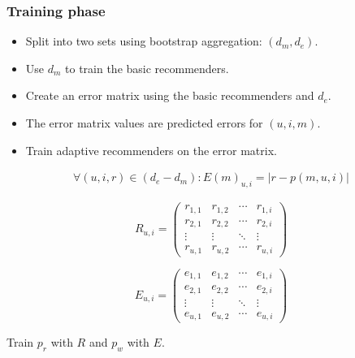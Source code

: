\documentclass[screen]{beamer}
\begin{document}
\begin{frame}
  
\end{frame}

\begin{frame}
  \frametitle{Training phase}
  
  \begin{itemize}
    \item Split into two sets using bootstrap aggregation: $(d_m,d_e)$.
    \item Use $d_m$ to train the basic recommenders.
    \item Create an error matrix using the basic recommenders and $d_e$. 
    \item The error matrix values are predicted errors for $(u,i,m)$.
    \item Train adaptive recommenders on the error matrix.
  \end{itemize}
  
  \begin{eqnarray}
    \forall (u,i,r) \in (d_e - d_m): E(m)_{u,i} = |r - p(m,u,i)|
  \end{eqnarray}
\end{frame}

\begin{frame}
  \begin{equation*}
     R_{u,i} =
     \begin{pmatrix}
      r_{1,1} & r_{1,2} & \cdots & r_{1,i} \\
      r_{2,1} & r_{2,2} & \cdots & r_{2,i} \\
      \vdots  & \vdots  & \ddots & \vdots  \\
      r_{u,1} & r_{u,2} & \cdots & r_{u,i}
     \end{pmatrix}
    \end{equation*}

  \vspace{1em}
  
    \begin{equation*}
     E_{u,i} =
     \begin{pmatrix}
        e_{1,1} & e_{1,2} & \cdots & e_{1,i} \\
        e_{2,1} & e_{2,2} & \cdots & e_{2,i} \\
        \vdots  & \vdots  & \ddots & \vdots  \\
        e_{u,1} & e_{u,2} & \cdots & e_{u,i}
     \end{pmatrix}
    \end{equation*}
    
    \vspace{1em}
    \begin{center}
      Train $p_r$ with $R$ and $p_w$ with $E$.
    \end{center}
\end{frame}
\end{document}
